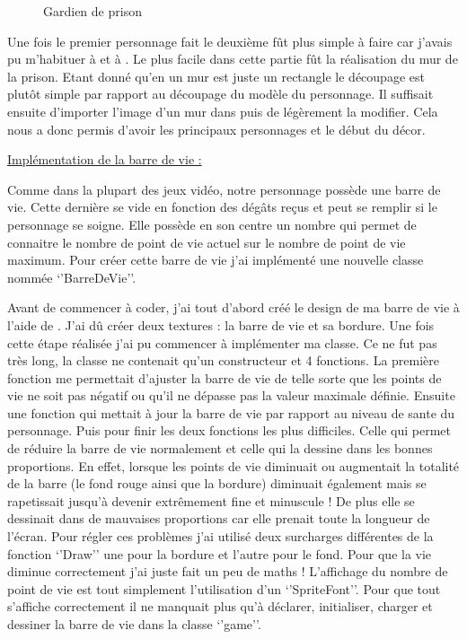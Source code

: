 \documentclass{article}
\begin{document}
\begin{figure}[htbp]
\begin{minipage}[c]{.45\linewidth}
\begin{center}
\caption{Gardien de prison}
\label{fig:bellik}
\end{center}
\end{minipage}
\end{figure}

\par
Une fois le premier personnage fait le deuxième fût plus simple à faire car j’avais pu m’habituer à  et à . Le plus facile dans cette partie fût la réalisation du mur de la prison. Etant donné qu’en  un mur est juste un rectangle le découpage est plutôt simple par rapport au découpage du modèle du personnage. Il suffisait ensuite d’importer l’image d’un mur dans  puis de légèrement la modifier.
\newline
Cela nous a donc permis d’avoir les principaux personnages et le début du décor.
\newline

\underline{Implémentation de la barre de vie :}
\newline

\par
Comme dans la plupart des jeux vidéo, notre personnage possède une barre de vie. Cette dernière se vide en fonction des dégâts reçus et peut se remplir si le personnage se soigne. Elle possède en son centre un nombre qui permet de connaitre le nombre de point de vie actuel sur le nombre de point de vie maximum. Pour créer cette barre de vie j’ai implémenté une nouvelle classe nommée ‘’BarreDeVie’’.

\par
Avant de commencer à coder, j’ai tout d’abord créé le design de ma barre de vie à l’aide de . J’ai dû créer deux textures : la barre de vie et sa bordure. Une fois cette étape réalisée j’ai pu commencer à implémenter ma classe. Ce ne fut pas très long, la classe ne contenait qu’un constructeur et 4 fonctions. La première fonction me permettait d’ajuster la barre de vie de telle sorte que les points de vie ne soit pas négatif ou qu’il  ne dépasse pas la valeur maximale définie. Ensuite une fonction qui mettait à jour la barre de vie par rapport au niveau de sante du personnage. Puis pour finir les deux fonctions les plus difficiles. Celle qui permet de réduire la barre de vie normalement et celle qui la dessine dans les bonnes proportions. En effet, lorsque les points de vie diminuait ou augmentait la totalité de la barre (le fond rouge ainsi que la bordure) diminuait également mais se rapetissait jusqu’à devenir extrêmement fine et minuscule ! De plus elle se dessinait dans de mauvaises proportions car elle  prenait toute la longueur de l’écran. Pour régler ces problèmes j’ai utilisé deux surcharges différentes de la fonction ‘’Draw’’ une pour la bordure et l’autre pour le fond. Pour que la vie diminue correctement j’ai juste fait un peu de maths ! L’affichage du nombre de point de vie est tout simplement l’utilisation d’un ‘’SpriteFont’’. Pour que tout s’affiche correctement il ne manquait plus qu’à déclarer, initialiser, charger et dessiner la barre de vie dans la classe ‘’game’’.
\end{document}
